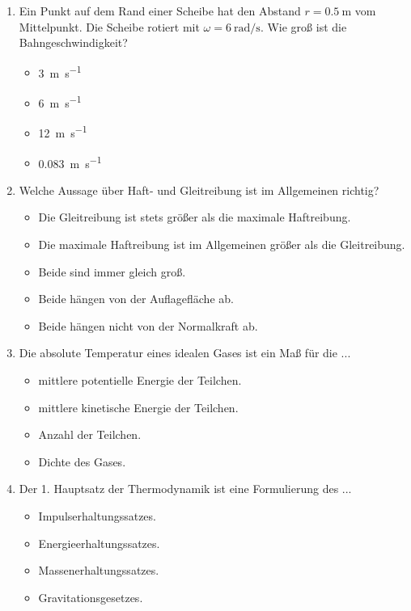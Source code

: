 \documentclass[11pt, a4paper]{article}
\begin{document}
\begin{enumerate}[label=\arabic*.,itemsep=18pt]
    \newpage
    \item Ein Punkt auf dem Rand einer Scheibe hat den Abstand $r = \SI{0.5}{\metre}$ vom Mittelpunkt. Die Scheibe rotiert mit $\omega = \SI{6}{\radian\per\second}$. Wie groß ist die Bahngeschwindigkeit?
    \begin{itemize}[label={$\square$},itemsep=1pt,topsep=0pt]
        \item \SI{3}{\metre\per\second}
        \item \SI{6}{\metre\per\second}
        \item \SI{12}{\metre\per\second}
        \item \SI{0.083}{\metre\per\second}
    \end{itemize}

    \item Welche Aussage über Haft- und Gleitreibung ist im Allgemeinen richtig?
    \begin{itemize}[label={$\square$},itemsep=1pt,topsep=0pt]
        \item Die Gleitreibung ist stets größer als die maximale Haftreibung.
        \item Die maximale Haftreibung ist im Allgemeinen größer als die Gleitreibung.
        \item Beide sind immer gleich groß.
        \item Beide hängen von der Auflagefläche ab.
        \item Beide hängen nicht von der Normalkraft ab.
    \end{itemize}

    \item Die absolute Temperatur eines idealen Gases ist ein Maß für die ...
    \begin{itemize}[label={$\square$},itemsep=1pt,topsep=0pt]
        \item mittlere potentielle Energie der Teilchen.
        \item mittlere kinetische Energie der Teilchen.
        \item Anzahl der Teilchen.
        \item Dichte des Gases.
    \end{itemize}

    \item Der 1. Hauptsatz der Thermodynamik ist eine Formulierung des ...
    \begin{itemize}[label={$\square$},itemsep=1pt,topsep=0pt]
        \item Impulserhaltungssatzes.
        \item Energieerhaltungssatzes.
        \item Massenerhaltungssatzes.
        \item Gravitationsgesetzes.
    \end{itemize}


\end{enumerate}
\end{document}
